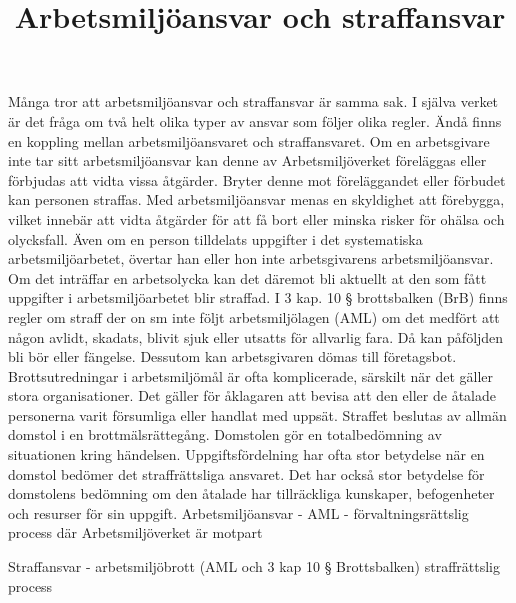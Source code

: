 \title{
Arbetsmiljöansvar och straffansvar
}
Många tror att arbetsmiljöansvar och straffansvar är samma sak. I själva verket är det fråga om två helt olika typer av ansvar som följer olika regler. Ändå finns en koppling mellan arbetsmiljöansvaret och straffansvaret. Om en arbetsgivare inte tar sitt arbetsmiljöansvar kan denne av Arbetsmiljöverket föreläggas eller förbjudas att vidta vissa åtgärder. Bryter denne mot föreläggandet eller förbudet kan personen straffas. Med arbetsmiljöansvar menas en skyldighet att förebygga, vilket innebär att vidta åtgärder för att få bort eller minska risker för ohälsa och olycksfall. Även om en person tilldelats uppgifter i det systematiska arbetsmiljöarbetet, övertar han eller hon inte arbetsgivarens arbetsmiljöansvar.
Om det inträffar en arbetsolycka kan det däremot bli aktuellt at den som fått uppgifter i arbetsmiljöarbetet blir straffad. I 3 kap. 10 § brottsbalken (BrB) finns regler om straff der on sm inte följt arbetsmiljölagen (AML) om det medfört att någon avlidt, skadats, blivit sjuk eller utsatts för allvarlig fara. Då kan påföljden bli bör eller fängelse. Dessutom kan arbetsgivaren dömas till företagsbot. Brottsutredningar i arbetsmiljömål är ofta komplicerade, särskilt när det gäller stora organisationer. Det gäller för åklagaren att bevisa att den eller de åtalade personerna varit försumliga eller handlat med uppsät. Straffet beslutas av allmän domstol i en brottmälsrättegång. Domstolen gör en totalbedömning av situationen kring händelsen. Uppgiftsfördelning har ofta stor betydelse när en domstol bedömer det straffrättsliga ansvaret. Det har också stor betydelse för domstolens bedömning om den åtalade har tillräckliga kunskaper, befogenheter och resurser för sin uppgift.
Arbetsmiljöansvar - AML - förvaltningsrättslig process där Arbetsmiljöverket är motpart

Straffansvar - arbetsmiljöbrott (AML och 3 kap 10 § Brottsbalken) straffrättslig process

